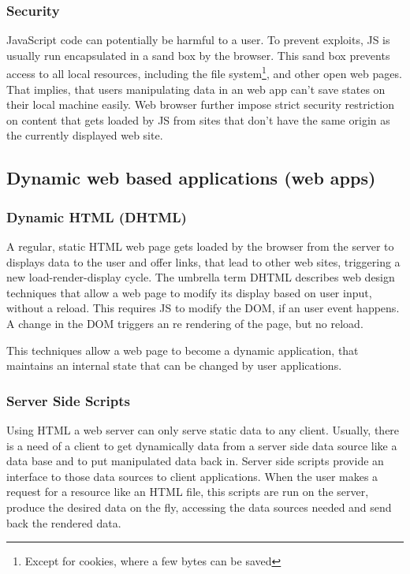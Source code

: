 
\subsubsection{Security}
JavaScript code can potentially be harmful to a user.
To prevent exploits, JS is usually run encapsulated in a sand box by the browser.
This sand box prevents access to all local resources, including the file system\footnote{Except for cookies, where a few bytes can be saved}, and other open web pages.
That implies, that users manipulating data in an web app can't save states on their local machine easily.
Web browser further impose strict security restriction on content that gets loaded by JS from sites that don't have the same origin as the currently displayed web site.


\subsection{Dynamic web based applications (web apps)}
\label{sec:webapps}
\subsubsection{Dynamic HTML (DHTML)}
\label{DHTML}

A regular, static HTML web page gets loaded by the browser from the server to displays data to the user and offer links, that lead to other web sites, triggering a new load-render-display cycle.
The umbrella term DHTML describes web design techniques that allow a web page to modify its display based on user input, without a reload.
This requires JS to modify the DOM, if an user event happens.
A change in the DOM triggers an re rendering of the page, but no reload.

This techniques allow a web page to become a dynamic application, that maintains an internal state that can be changed by user applications.


\subsubsection{Server Side Scripts}
\label{sec:serverside}

Using HTML a web server can only serve static data to any client.
Usually, there is a need of a client to get dynamically data from a server side data source like a data base and to put manipulated data back in.
Server side scripts provide an interface to those data sources to client applications.
When the user makes a request for a resource like an HTML file, this scripts are run on the server, produce the desired data on the fly, accessing the data sources needed and send back the rendered data.

